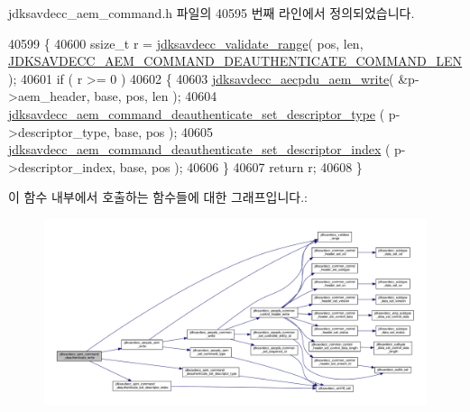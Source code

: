 jdksavdecc\+\_\+aem\+\_\+command.\+h 파일의 40595 번째 라인에서 정의되었습니다.


\begin{DoxyCode}
40599 \{
40600     ssize\_t r = \hyperlink{group__util_ga9c02bdfe76c69163647c3196db7a73a1}{jdksavdecc\_validate\_range}( pos, len, 
      \hyperlink{group__command__deauthenticate_ga4d0ff409a7a6e6a94b332c5551942a31}{JDKSAVDECC\_AEM\_COMMAND\_DEAUTHENTICATE\_COMMAND\_LEN} );
40601     \textcolor{keywordflow}{if} ( r >= 0 )
40602     \{
40603         \hyperlink{group__aecpdu__aem_gad658e55771cce77cecf7aae91e1dcbc5}{jdksavdecc\_aecpdu\_aem\_write}( &p->aem\_header, base, pos, len );
40604         \hyperlink{group__command__deauthenticate_ga282ebdade6638f9e29f0eb037d7c9825}{jdksavdecc\_aem\_command\_deauthenticate\_set\_descriptor\_type}
      ( p->descriptor\_type, base, pos );
40605         \hyperlink{group__command__deauthenticate_ga8e8dec78975974db6d250f1fc0fb3019}{jdksavdecc\_aem\_command\_deauthenticate\_set\_descriptor\_index}
      ( p->descriptor\_index, base, pos );
40606     \}
40607     \textcolor{keywordflow}{return} r;
40608 \}
\end{DoxyCode}


이 함수 내부에서 호출하는 함수들에 대한 그래프입니다.\+:
\nopagebreak
\begin{figure}[H]
\begin{center}
\leavevmode
\includegraphics[width=350pt]{group__command__deauthenticate_gab111156c760a571f31bc2b8e8bc412d1_cgraph}
\end{center}
\end{figure}


